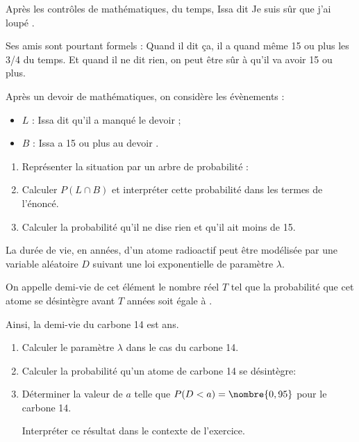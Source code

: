 \begin{question}[topic=probabilités]
  Après les contrôles de mathématiques,  du temps, Issa dit \og Je
  suis sûr que j'ai loupé \fg.

  Ses amis sont pourtant formels : \og Quand il dit ça, il a quand même 15
  ou plus les 3/4 du temps.
  Et quand il ne dit rien, on peut être sûr à  qu'il va avoir 15
  ou plus. \fg

  Après un devoir de mathématiques, on considère les évènements :
  \begin{itemize}
    \item $L$ : \og Issa dit qu'il a manqué le devoir \fg ;
    \item $B$ : \og Issa a 15 ou plus au devoir \fg.
  \end{itemize}
  \vspace{-1\baselineskip}
  \begin{enumerate}
    \item Représenter la situation par un arbre de probabilité :
    \item Calculer $P(L\cap B)$ et interpréter cette probabilité dans les
      termes de l'énoncé.
    \item Calculer la probabilité qu'il ne dise rien et qu'il ait moins de 15.
  \end{enumerate}
\end{question}

\begin{question}[topic=loi_continue]
  La durée de vie, en années, d'un atome radioactif peut être modélisée par
  une variable aléatoire $D$ suivant une loi exponentielle de paramètre
  $\lambda$.

  On appelle demi-vie de cet élément le nombre réel $T$ tel que la
  probabilité que cet atome se désintègre avant $T$ années soit égale à
  .

  Ainsi, la demi-vie du carbone 14 est  ans.
  \begin{enumerate}
    \item Calculer le paramètre $\lambda$ dans le cas du carbone 14.
    \item Calculer la probabilité qu'un atome de carbone 14 se désintègre:
    \item Déterminer la valeur de $a$ telle que $P(D<a)=\nombre{0,95}$ pour
      le carbone 14.

      Interpréter ce résultat dans le contexte de l'exercice.
  \end{enumerate}
\end{question}
